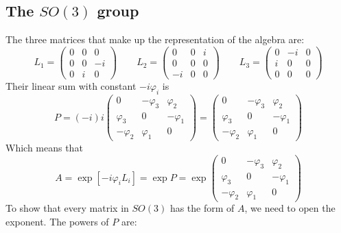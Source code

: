 \documentclass{article}
\begin{document}
\subsection{The $SO(3)$ group}
The three matrices that make up the representation of the algebra are:
\begin{equation}
    L_1 = \begin{pmatrix}
        0 & 0 & 0 \\
        0 & 0 & -i \\
        0 & i & 0
    \end{pmatrix}
    \qquad
    L_2 = \begin{pmatrix}
        0 & 0 & i \\
        0 & 0 & 0 \\
        -i & 0 & 0
    \end{pmatrix}
    \qquad
    L_3 = \begin{pmatrix}
        0 & -i & 0 \\
        i & 0 & 0 \\
        0 & 0 & 0
    \end{pmatrix}
\end{equation}
Their linear sum with constant $-i\varphi_i$ is
\begin{equation}
    P = (-i) i \begin{pmatrix}
        0 & -\varphi_3 & \varphi_2 \\
        \varphi_3 & 0 & -\varphi_1 \\
        -\varphi_2 & \varphi_1 & 0
    \end{pmatrix} = \begin{pmatrix}
        0 & -\varphi_3 & \varphi_2 \\
        \varphi_3 & 0 & -\varphi_1 \\
        -\varphi_2 & \varphi_1 & 0
    \end{pmatrix}
\end{equation}
Which means that
\begin{equation}
    A = \exp\left[-i\varphi_i L_i\right] = \exp P = \exp \begin{pmatrix}
        0 & -\varphi_3 & \varphi_2 \\
        \varphi_3 & 0 & -\varphi_1 \\
        -\varphi_2 & \varphi_1 & 0
    \end{pmatrix}
\end{equation}
To show that every matrix in $SO(3)$ has the form of $A$, we need to open the exponent. The powers of $P$ are:
\end{document}
